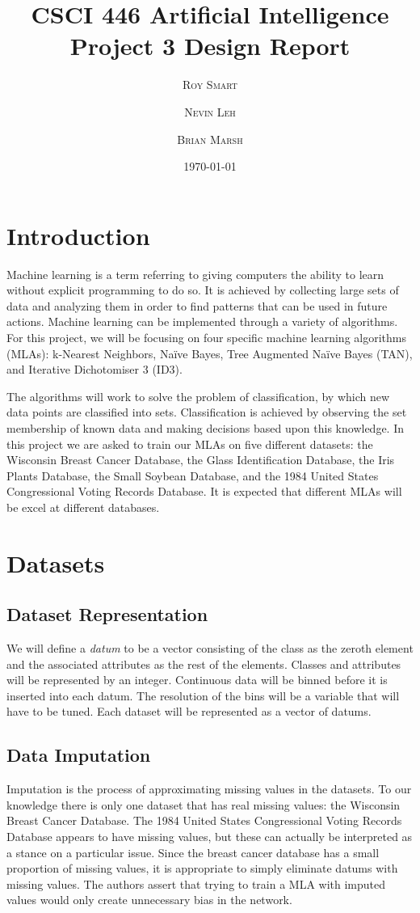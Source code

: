 \documentclass{article}
\title{\vspace{-15mm}\fontsize{24pt}{10pt}\selectfont\textbf{CSCI 446 Artificial Intelligence \\[2mm] Project 3 Design Report} } %
\date{\today}
\author{
\large
\textsc{Roy Smart} \and \textsc{Nevin Leh} \and \textsc{Brian Marsh}\\[2mm] %
}
\begin{document}
	\maketitle %
	\thispagestyle{fancy} %
	\normalsize

	\section{Introduction}
		Machine learning is a term referring to giving computers the ability to learn without explicit programming to do so.  
		It is achieved by collecting large sets of data and analyzing them in order to find patterns that can be used in future actions.  
		Machine learning can be implemented through a variety of algorithms.  
		For this project, we will be focusing on four specific machine learning algorithms (MLAs): k-Nearest Neighbors, Naïve Bayes, Tree Augmented Naïve Bayes (TAN), and Iterative Dichotomiser 3 (ID3). 
		
		The algorithms will work to solve the problem of classification, by which new data points are classified into sets.
		Classification is achieved by observing the set membership of known data and making decisions based upon this knowledge.
		In this project we are asked to train our MLAs on five different datasets: the Wisconsin Breast Cancer Database, the Glass Identification Database, the Iris Plants Database, the Small Soybean Database, and the 1984 United States Congressional Voting Records Database. It is expected that different MLAs will be excel at different databases.
	\section{Datasets}
		\subsection{Dataset Representation}
			We will define a \textit{datum} to be a vector consisting of the class as the zeroth element and the associated attributes as the rest of the elements. Classes and attributes will be represented by an integer. Continuous data will be binned before it is inserted into each datum. The resolution of the bins will be a variable that will have to be tuned. Each dataset will be represented as a vector of datums.
		\subsection{Data Imputation}
			Imputation is the process of approximating missing values in the datasets. 
			To our knowledge there is only one dataset that has real missing values: the Wisconsin Breast Cancer Database. 
			The 1984 United States Congressional Voting Records Database appears to have missing values, but these can actually be interpreted as a stance on a particular issue. 
			Since the breast cancer database has a small proportion of missing values, it is appropriate to simply eliminate datums with missing values. 
			The authors assert that trying to train a MLA with imputed values would only create unnecessary bias in the network.
			
\end{document}

